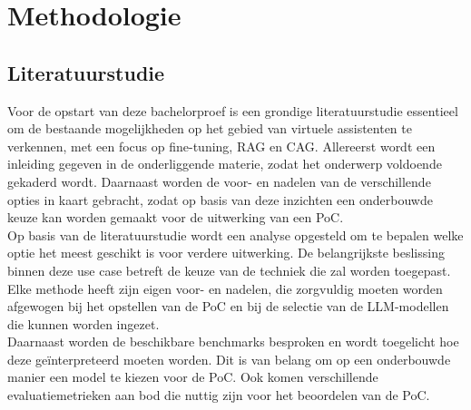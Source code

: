 
\chapter{Methodologie}
\label{ch:methodologie}


\section{Literatuurstudie}

Voor de opstart van deze bachelorproef is een grondige literatuurstudie essentieel om de bestaande mogelijkheden op het gebied van virtuele assistenten te verkennen, met een focus op fine-tuning, RAG en CAG. Allereerst wordt een inleiding gegeven in de onderliggende materie, zodat het onderwerp voldoende gekaderd wordt. Daarnaast worden de voor- en nadelen van de verschillende opties in kaart gebracht, zodat op basis van deze inzichten een onderbouwde keuze kan worden gemaakt voor de uitwerking van een PoC.
\\[1em]
Op basis van de literatuurstudie wordt een analyse opgesteld om te bepalen welke optie het meest geschikt is voor verdere uitwerking. De belangrijkste beslissing binnen deze use case betreft de keuze van de techniek die zal worden toegepast. Elke methode heeft zijn eigen voor- en nadelen, die zorgvuldig moeten worden afgewogen bij het opstellen van de PoC en bij de selectie van de LLM-modellen die kunnen worden ingezet.
\\[1em]
Daarnaast worden de beschikbare benchmarks besproken en wordt toegelicht hoe deze geïnterpreteerd moeten worden. Dit is van belang om op een onderbouwde manier een model te kiezen voor de PoC. Ook komen verschillende evaluatiemetrieken aan bod die nuttig zijn voor het beoordelen van de PoC.

